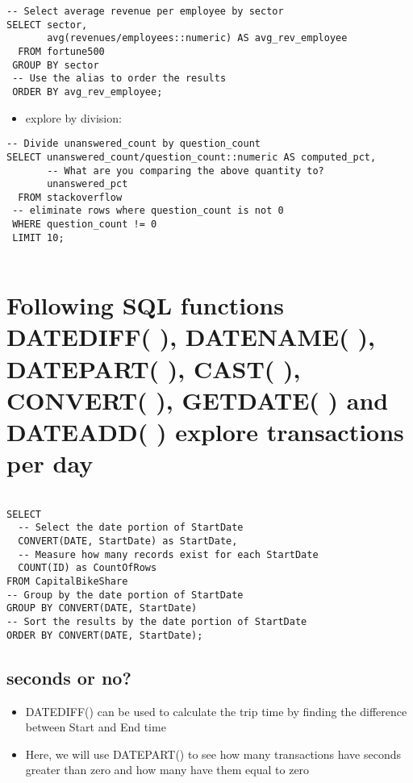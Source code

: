 \documentclass[]{book}
\providecommand{\tightlist}{%
  \setlength{\itemsep}{0pt}\setlength{\parskip}{0pt}}
\begin{document}
\begin{verbatim}
-- Select average revenue per employee by sector
SELECT sector, 
       avg(revenues/employees::numeric) AS avg_rev_employee
  FROM fortune500
 GROUP BY sector
 -- Use the alias to order the results
 ORDER BY avg_rev_employee;
\end{verbatim}

\begin{itemize}
\tightlist
\item
  explore by division:
\end{itemize}

\begin{verbatim}
-- Divide unanswered_count by question_count
SELECT unanswered_count/question_count::numeric AS computed_pct, 
       -- What are you comparing the above quantity to?
       unanswered_pct
  FROM stackoverflow
 -- eliminate rows where question_count is not 0
 WHERE question_count != 0
 LIMIT 10;
 
\end{verbatim}

\hypertarget{following-sql-functions-datediff-datename-datepart-cast-convert-getdate-and-dateadd-explore-transactions-per-day}{%
\chapter{Following SQL functions DATEDIFF( ), DATENAME( ), DATEPART( ), CAST( ), CONVERT( ), GETDATE( ) and DATEADD( ) explore transactions per day}\label{following-sql-functions-datediff-datename-datepart-cast-convert-getdate-and-dateadd-explore-transactions-per-day}}

\begin{verbatim}

SELECT
  -- Select the date portion of StartDate
  CONVERT(DATE, StartDate) as StartDate,
  -- Measure how many records exist for each StartDate
  COUNT(ID) as CountOfRows 
FROM CapitalBikeShare 
-- Group by the date portion of StartDate
GROUP BY CONVERT(DATE, StartDate)
-- Sort the results by the date portion of StartDate
ORDER BY CONVERT(DATE, StartDate);
\end{verbatim}

\hypertarget{seconds-or-no}{%
\section{seconds or no?}\label{seconds-or-no}}

\begin{itemize}
\tightlist
\item
  DATEDIFF() can be used to calculate the trip time by finding the difference between Start and End time
\item
  Here, we will use DATEPART() to see how many transactions have seconds greater than zero and how many have them equal to zero
\end{itemize}
\end{document}
